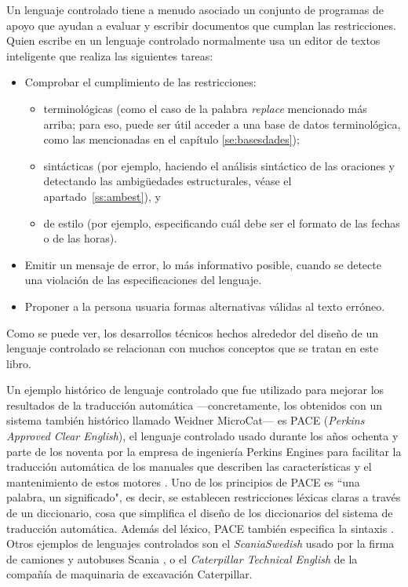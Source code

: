 Un lenguaje controlado tiene a menudo asociado un conjunto de programas de apoyo que ayudan a evaluar y escribir documentos que cumplan las restricciones. Quien escribe en un lenguaje controlado normalmente usa un editor de textos inteligente que realiza las siguientes tareas: \begin{itemize} \item Comprobar el cumplimiento de las restricciones: \begin{itemize} \item terminológicas (como el caso de la palabra \emph{replace} mencionado más arriba; para eso, puede ser útil acceder a una base de datos terminológica, como las mencionadas en el capítulo \ref{se:basesdades}); \item sintácticas (por ejemplo, haciendo el análisis sintáctico de las oraciones y detectando las ambigüedades estructurales, véase el apartado~\ref{ss:ambest}), y \item de estilo (por ejemplo, especificando cuál debe ser el formato de las fechas o de las horas). \end{itemize} \item Emitir un mensaje de error, lo más informativo posible, cuando se detecte una violación de las especificaciones del lenguaje. \item Proponer a la persona usuaria formas alternativas válidas al texto erróneo. \end{itemize} Como se puede ver, los desarrollos técnicos hechos alrededor del diseño de un lenguaje controlado se relacionan con muchos conceptos que se tratan en este libro. 

Un ejemplo histórico de lenguaje controlado que fue utilizado para mejorar los resultados de la traducción automática ---concretamente, los obtenidos con un sistema también histórico llamado Weidner MicroCat--- es PACE (\emph{Perkins Approved Clear English}), el lenguaje controlado usado durante los años ochenta y parte de los noventa por la empresa de ingeniería Perkins Engines para facilitar la traducción automática de los manuales que describen las características y el mantenimiento de estos motores \citep{newton92b,douglas96p}. Uno de los principios de PACE es ``una palabra, un significado", es decir, se establecen restricciones léxicas claras a través de un diccionario, cosa que simplifica el diseño de los diccionarios del sistema de traducción automática. Además del léxico, PACE también especifica la sintaxis \cite[secció 8.3]{arnold94b}. Otros ejemplos de lenguajes controlados son el \emph{ScaniaSwedish} usado por la firma de camiones y autobuses Scania \citep{almqvist96p}, o el {\em Caterpillar Technical English} de la compañía de maquinaria de excavación Caterpillar. 


